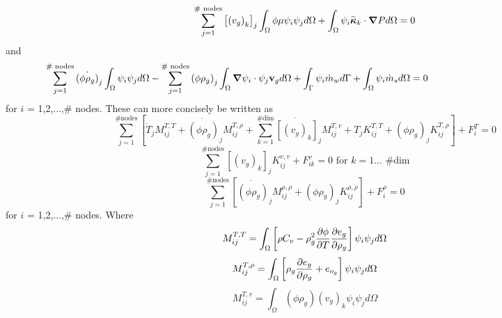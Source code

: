 \begin{equation}
  \sum_{j=1}^{\text{\# nodes}} \left[\left(v_{g}\right)_{k}\right]_{j} \int_{\Omega} \phi\mu\psi_{i} \psi_{j} d \Omega + \int_{\Omega} \psi_{i} \widetilde{\boldsymbol{\kappa}}_{k} \cdot {\boldsymbol{\nabla}} {P} d \Omega = 0 
\end{equation}
and
\begin{equation}
  \sum_{j=1}^{\text{\# nodes}} \dot{\left( \phi \rho_{g} \right)}_{j} \int_{\Omega} \psi_{i} \psi_{j} d \Omega 
  - \sum_{j=1}^{\text{\# nodes}} \left( \phi \rho_{g} \right)_{j} \int_{\Omega} \grad{\psi_{i}} \cdot \psi_{j} \mathbf{v}_g d \Omega + \int_{\Gamma} \psi_{i} \dot{m}_{w} d \Gamma + \int_{\Omega} \psi_{i} \dot{m}_{s} d \Omega = 0 \hspace{14eM}
\end{equation}
for $i$ = 1,2,...,\# nodes. These can more concisely be written as
\begin{equation}
  \sum_{j=1}^{\text{\# nodes}} \left[\dot{T}_{j} M^{T,T}_{ij} 
  + \dot{\left( \phi \rho_{g} \right)}_{j} M^{T,\rho}_{ij} 
  + \sum_{k=1}^{\text{\# dim}} \dot{\left[\left(v_{g}\right)_{k}\right]}_{j} M^{T,v}_{ij} 
  + T_{j} K^{T,T}_{ij} 
  + \left( \phi \rho_{g} \right)_{j} K^{T,\rho}_{ij} \right] 
  + F^{T}_{i} = 0
  \label{eq:ablation_concise_energy_eqn}
\end{equation}
\begin{equation}
  \sum_{j=1}^{\text{\# nodes}} \left[\left(v_{g}\right)_{k}\right]_{j} K^{v,v}_{ij} 
  +  F^{v}_{ik} = 0 \text{ for $k = 1...$ \# dim}
  \label{eq:ablation_concise_momentum_eqn}
\end{equation}
\begin{equation}
  \sum_{j=1}^{\text{\# nodes}} \left[ \dot{\left( \phi \rho_{g} \right)}_{j} M^{\rho,\rho}_{ij} 
  + \left( \phi \rho_{g} \right)_{j} K^{\rho,\rho}_{ij} \right] 
  + F^{\rho}_{i} = 0
  \label{eq:ablation_concise_gas_eqn}
\end{equation}
for $i$ = 1,2,...,\# nodes. Where
\begin{equation}
  M^{T,T}_{ij} = \int_{\Omega} \left[ \rho C_{v} - \rho_{g}^{2} {\frac{\partial{\phi}}{\partial{T}}}{\frac{\partial{e_{g}}}{\partial{\rho_{g}}}} \right] \psi_{i} \psi_{j} d \Omega
  \label{eq:first_integral}
\end{equation}
\begin{equation}
  M^{T,\rho}_{ij} = \int_{\Omega} \left[ \rho_{g} {\frac{\partial{e_{g}}}{\partial{\rho_{g}}}} + e_{o_{g}}\right] \psi_{i} \psi_{j} d \Omega
\end{equation}
\begin{equation}
  M^{T,v}_{ij} = \int_{\Omega} \left( \phi \rho_{g} \right) \left(v_{g}\right)_{k} \psi_{i} \psi_{j}  d \Omega
\end{equation}
